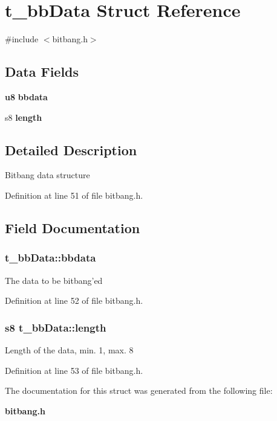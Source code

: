 \section{t\-\_\-bb\-Data Struct Reference}
\label{structt__bb_data}


{\ttfamily \#include $<$bitbang.\-h$>$}

\subsection*{Data Fields}
\begin{DoxyCompactItemize}
\item 
{\bf u8} {\bf bbdata}
\item 
s8 {\bf length}
\end{DoxyCompactItemize}


\subsection{Detailed Description}
Bitbang data structure 

Definition at line 51 of file bitbang.\-h.



\subsection{Field Documentation}
\subsubsection[{bbdata}]{ t\-\_\-bb\-Data\-::bbdata}\label{structt__bb_data_a72de420ef25bf8ea5e332df791a10c7b}
The data to be bitbang'ed 

Definition at line 52 of file bitbang.\-h.

\subsubsection[{length}]{\setlength{\rightskip}{0pt plus 5cm}s8 t\-\_\-bb\-Data\-::length}\label{structt__bb_data_a40daec4b08a0296e7f550df0d7041648}
Length of the data, min. 1, max. 8 

Definition at line 53 of file bitbang.\-h.



The documentation for this struct was generated from the following file\-:\begin{DoxyCompactItemize}
\item 
{\bf bitbang.\-h}\end{DoxyCompactItemize}
